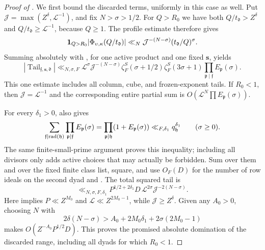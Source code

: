 \begin{proof}[Proof of ]
We first bound the discarded terms, uniformly in this case as well.  Put
$\mathcal J=\max(Z^\delta,\mathcal L^{-1})$, and fix $N>\sigma>1/2$.
For $Q>R_0$ we have both $Q/t_{\mathfrak d}>Z^\delta$ and
$Q/t_{\mathfrak d}\geq\mathcal L^{-1}$, because $Q\geq1$.
The profile estimate therefore gives
\[
 \mathbf{1}_{Q>R_0}|\Phi_{\upsilon,\kappa}(Q/t_{\mathfrak d})|
 \ll_N \mathcal J^{-(N-\sigma)}(t_{\mathfrak d}/Q)^\sigma.
\]
Summing absolutely with , for one
active product and one fixed \(\mathbf s\), yields
\begin{equation}\label{eq:reflection-tail-bound}
 |\operatorname{Tail}_{\mathfrak f,\mathbf s,\mathfrak d}|
 \ll_{N,\sigma,F}
 \mathcal L^\sigma\mathcal J^{-(N-\sigma)}
 \zeta_F^S(\sigma+1/2)\zeta_F^S(3\sigma+1)
 \prod_{\mathfrak p\mid\mathfrak f}E_{\mathfrak p}(\sigma).
\end{equation}
This one estimate includes all column, cube, and frozen-exponent tails.
If $R_0<1$, then $\mathcal J=\mathcal L^{-1}$ and the corresponding
entire partial sum is $O(\mathcal L^N\prod E_{\mathfrak p}(\sigma))$.

For every $\delta_1>0$,  also gives
\begin{equation}\label{eq:reflection-active-choice-sum}
 \sum_{\mathfrak f\mid\operatorname{rad}(\mathfrak h)}
       \prod_{\mathfrak p\mid\mathfrak f}E_{\mathfrak p}(\sigma)
   =\prod_{\mathfrak p\mid\mathfrak h}(1+E_{\mathfrak p}(\sigma))
   \ll_{F,\delta_1}q_{\mathfrak h}^{\delta_1}
   \qquad(\sigma\geq0).
\end{equation}
The same finite-small-prime argument proves this inequality; including all
divisors only adds active choices that may actually be forbidden.  Sum
 over them and over the fixed finite class
list, square, and use $O_F(D)$ for the number of row ideals on the second
dyad and .  The total squared tail is
\begin{equation}\label{eq:reflection-tail-mass}
 \ll_{N,\sigma,F,\delta_1}
 P^{1/2+2\delta_1}D\,
 \mathcal L^{2\sigma}\mathcal J^{-2(N-\sigma)}.
\end{equation}
Here  implies
$P\ll Z^{M_0}$ and $\mathcal L\ll Z^{2M_0-1}$, while
$\mathcal J\geq Z^\delta$.  Given any $A_0>0$, choosing $N$ with
\[
 2\delta(N-\sigma)>A_0+2M_0\delta_1+2\sigma(2M_0-1)
\]
makes 
$O(Z^{-A_0}P^{1/2}D)$.  This proves the promised absolute domination of
the discarded range, including all dyads for which $R_0<1$.


\end{proof}
